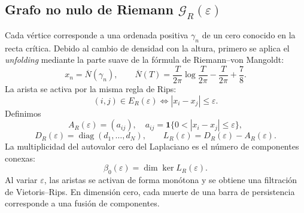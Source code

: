 \documentclass[11pt]{amsart}
\theoremstyle{definition}
\theoremstyle{remark}
\begin{document}
\subsection{Grafo no nulo de Riemann $\mathcal G_R(\varepsilon)$}
Cada vértice corresponde a una ordenada positiva $\gamma_n$ de un cero conocido en la recta crítica. Debido al cambio de densidad con la altura, primero se aplica el \emph{unfolding} mediante la parte suave de la fórmula de Riemann--von Mangoldt:
\begin{equation}\label{eq:unfold}
 x_n=\overline N(\gamma_n),\qquad
 \overline N(T)=\frac{T}{2\pi}\log\frac{T}{2\pi}-\frac{T}{2\pi}+\frac78.
\end{equation}
La arista se activa por la misma regla de Rips:
\begin{equation}\label{eq:riemannedge}
 (i,j)\in E_R(\varepsilon)
 \iff |x_i-x_j|\le\varepsilon.
\end{equation}
Definimos
\begin{equation}
 A_R(\varepsilon)=(a_{ij}),\quad
 a_{ij}=\mathbf 1\{0<|x_i-x_j|\le\varepsilon\},
\end{equation}
\begin{equation}
 D_R(\varepsilon)=\operatorname{diag}(d_1,\ldots,d_N),\qquad
 L_R(\varepsilon)=D_R(\varepsilon)-A_R(\varepsilon).
\end{equation}
La multiplicidad del autovalor cero del Laplaciano es el número de componentes conexas:
\begin{equation}\label{eq:beta0}
 \beta_0(\varepsilon)=\dim\ker L_R(\varepsilon).
\end{equation}
Al variar $\varepsilon$, las aristas se activan de forma monótona y se obtiene una filtración de Vietoris--Rips. En dimensión cero, cada muerte de una barra de persistencia corresponde a una fusión de componentes.
\end{document}
